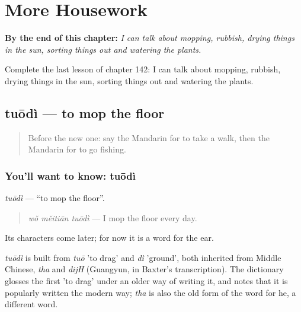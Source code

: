 
\chapter{More Housework}
\label{ch:zh-more-housework}

\begin{chapteropening}
\textbf{By the end of this chapter:} \emph{I can talk about mopping, rubbish, drying things in the sun, sorting things out and watering the plants.}

Complete the last lesson of chapter 142: I can talk about mopping, rubbish, drying things in the sun, sorting things out and watering the plants.
\end{chapteropening}

\section[tuōdì]{tuōdì — to mop the floor}

\label{lesson:ZH-C142-tuodi}



\begin{quote}
Before the new one: say the Mandarin for to take a walk, then the Mandarin for to go fishing.
\end{quote}

\subsection*{You'll want to know: tuōdì}
\emph{tuōdì} — \textquotedblleft{}to mop the floor\textquotedblright{}.

\begin{quote}
\emph{wǒ měitiān tuōdì} — I mop the floor every day.
\end{quote}

Its characters come later; for now it is a word for the ear.

\begin{cousinweb}
\emph{tuōdì} is built from \emph{tuō} 'to drag' and \emph{dì} 'ground', both inherited from Middle Chinese, \emph{tha} and \emph{dijH} (Guangyun, in Baxter's transcription). The dictionary glosses the first 'to drag' under an older way of writing it, and notes that it is popularly written the modern way; \emph{tha} is also the old form of the word for he, a different word.
\end{cousinweb}

